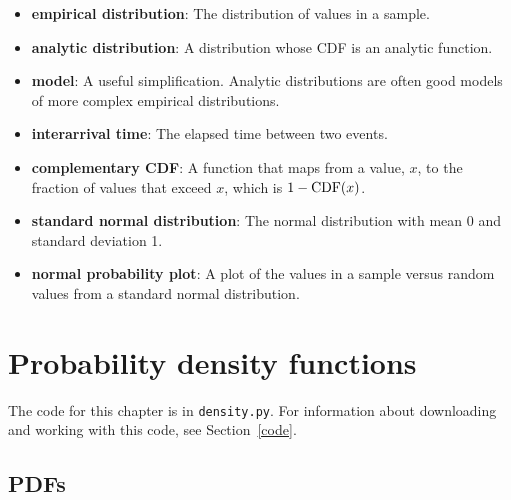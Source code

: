 \documentclass[12pt]{book}
\begin{document}
\begin{itemize}

\item {\bf empirical distribution}: The distribution of values in a sample.
   

\item {\bf analytic distribution}: A distribution whose CDF is an analytic
function.

\item {\bf model}: A useful simplification.  Analytic distributions are
often good models of more complex empirical distributions.

\item {\bf interarrival time}: The elapsed time between two events.

\item {\bf complementary CDF}: A function that maps from a value, $x$,
to the fraction of values that exceed $x$, which is $1 - \mathrm{CDF}(x)$.
  

\item {\bf standard normal distribution}: The normal distribution with
mean 0 and standard deviation 1.

\item {\bf normal probability plot}: A plot of the values in a sample versus
random values from a standard normal distribution.

\end{itemize}


\chapter{Probability density functions}
\label{density}

The code for this chapter is in {\tt density.py}.  For information
about downloading and working with this code, see Section~\ref{code}.


\section{PDFs}
\end{document}

